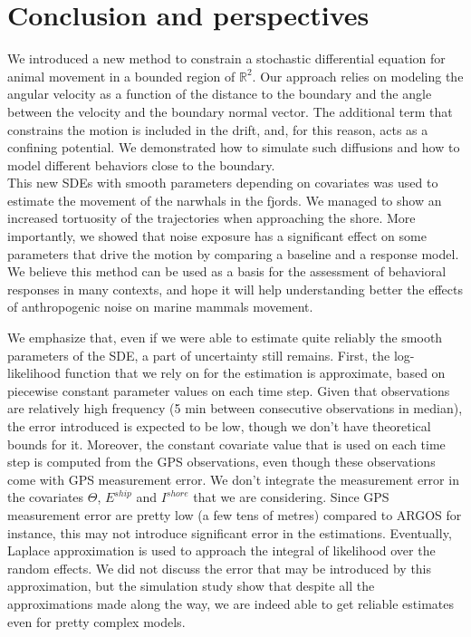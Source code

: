 \documentclass[aoas]{imsart}
\theoremstyle{definition}
\theoremstyle{remark}
\theoremstyle{remark}
\newcommand {\R}{\mathbb{R}}
\newcommand {\1}{\mathbb{1}}
\begin{document}
\section{Conclusion and perspectives}


We introduced a new method to constrain a stochastic differential equation for animal movement in a bounded region of $\R^2$. Our approach relies on modeling the angular velocity as a function of the distance to the boundary and the angle between the velocity and the boundary normal vector. The additional term that constrains the motion is included in the drift, and, for this reason, acts as a confining potential.
We demonstrated how to simulate such diffusions and how to model different behaviors close to the boundary.\\

This new SDEs with smooth parameters depending on covariates was used to estimate the movement of the narwhals in the fjords. We managed to show an increased tortuosity of the trajectories when approaching the shore. More importantly, we showed that noise exposure has a significant effect on some parameters that drive the motion by comparing a baseline and a response model. We believe this method can be used as a basis for the assessment of behavioral responses in many contexts, and hope it will help understanding better the effects of anthropogenic noise on marine mammals movement.

We emphasize that, even if we were able to estimate quite reliably the smooth parameters of the SDE, a part of uncertainty still remains. First, the log-likelihood function that we rely on for the estimation is approximate, based on piecewise constant parameter values on each time step. Given that observations are relatively high frequency (5 min between consecutive observations in median), the error introduced is expected to be low, though we don't have theoretical bounds for it. Moreover, the constant covariate value that is used on each time step is computed from the GPS observations, even though these observations come with GPS measurement error. We don't integrate the measurement error in the covariates $\Theta$, $E^{ship}$ and $I^{shore}$ that we are considering. Since GPS measurement error are pretty low (a few tens of metres) compared to ARGOS for instance, this may not introduce significant error in the estimations. Eventually, Laplace approximation is used to approach the integral of likelihood over the random effects. We did not discuss the error that may be introduced by this approximation, but the simulation study show that despite all the approximations made along the way, we are indeed able to get reliable estimates even for pretty complex models.\\
\end{document}
